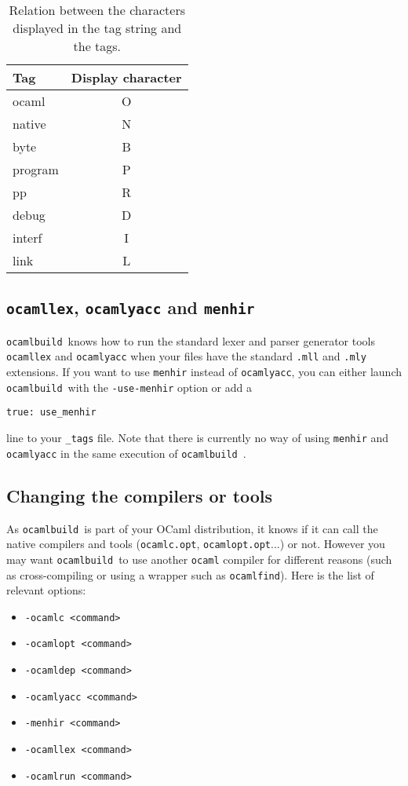 \documentclass[12pt]{article}
\newcommand{\ocb}{\texttt{ocamlbuild}~}
\begin{document}
\begin{table}
  \begin{center}
    \begin{tabular}{|l|c|}
       \hline
       \textbf{Tag} & \textbf{Display character} \\
       \hline
       \hline
       ocaml	& O \\
       \hline
       native	& N \\
       \hline
       byte	& B \\
       \hline
       program	& P \\
       \hline
       pp	        & R \\
       \hline
       debug	& D \\
       \hline
       interf	& I \\
       \hline
       link	& L \\
       \hline
    \end{tabular}
  \end{center}
  \caption{\label{tab:tag-chars} Relation between the characters displayed in
    the tag string and the tags.}
\end{table}
\subsection{\texttt{ocamllex}, \texttt{ocamlyacc} and \texttt{menhir}}
\ocb knows how to run the standard lexer and parser generator tools
\texttt{ocamllex} and \texttt{ocamlyacc} when your files have the
standard \texttt{.mll} and \texttt{.mly} extensions.  If you want to
use \texttt{menhir} instead of \texttt{ocamlyacc}, you can either
launch \ocb with the \texttt{-use-menhir} option or add a
\begin{verbatim}
true: use_menhir
\end{verbatim}
line to your \texttt{\_tags} file.  Note that there is currently no way
of using \texttt{menhir} and \texttt{ocamlyacc} in the same execution
of \ocb.
\subsection{Changing the compilers or tools}
As \ocb is part of your OCaml distribution, it knows if it can call the
native compilers and tools (\texttt{ocamlc.opt}, \texttt{ocamlopt.opt}...)
or not.  However you may want \ocb to use another \texttt{ocaml} compiler
for different reasons (such as cross-compiling or using a wrapper such as
\texttt{ocamlfind}).  Here is the list of relevant options:
\begin{itemize}
  \item \texttt{-ocamlc <command>}
  \item \texttt{-ocamlopt <command>}
  \item \texttt{-ocamldep <command>}
  \item \texttt{-ocamlyacc <command>}
  \item \texttt{-menhir <command>}
  \item \texttt{-ocamllex <command>}
  \item \texttt{-ocamlrun <command>}
\end{itemize}
\end{document}
